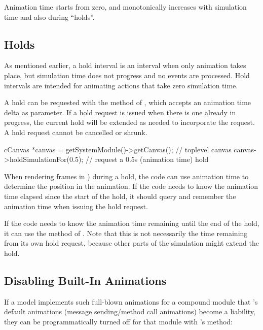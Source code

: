 Animation time starts from zero, and monotonically increases with simulation
time and also during ``holds''.


\subsection{Holds}
\label{sec:graphics:animation-hold}

As mentioned earlier, a hold interval is an interval when only animation
takes place, but simulation time does not progress and no events
are processed. Hold intervals are intended for animating actions
that take zero simulation time.

A hold can be requested with the  method
of , which accepts an animation time delta as parameter.
If a hold request is issued when there is one already in progress,
the current hold will be extended as needed to incorporate the
request. A hold request cannot be cancelled or shrunk.

\begin{cpp}
cCanvas *canvas = getSystemModule()->getCanvas(); // toplevel canvas
canvas->holdSimulationFor(0.5); // request a 0.5s (animation time) hold
\end{cpp}

When rendering frames in ) during a hold, the code
can use animation time to determine the position in the animation.
If the code needs to know the animation time elapsed since the start of
the hold, it should query and remember the animation time when issuing
the hold request.

If the code needs to know the animation time remaining until the end
of the hold, it can use the 
method of . Note that this is not necessarily the
time remaining from its own hold request, because other parts of the
simulation might extend the hold.


\subsection{Disabling Built-In Animations}
\label{sec:graphics:disabling-built-in-anims}

If a model implements such full-blown animations for a compound module that
{\opp}'s default animations (message sending/method call animations) become
a liability, they can be programmatically turned off for that module with
's  method:

